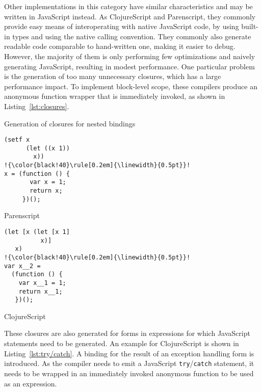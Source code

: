 \documentclass{acm_proc_article-sp}
\makeatletter
\newenvironment{sublisting}[2][]{%
\def\sf@one{#1}%
\def\sf@two{#2}%
\setbox\sf@box\hbox
\bgroup
}{%
\egroup
\ifx\@empty\sf@two\@empty\relax
\def\sf@two{\@empty}
\fi
\ifx\@empty\sf@one\@empty\relax
\subfloat[\sf@two]{\box\sf@box}%
\else
\subfloat[\sf@one][\sf@two]{\box\sf@box}%
\fi
}
\makeatother
\begin{document}
Other implementations in this category have similar characteristics
and may be written in JavaScript instead. As ClojureScript and
Parenscript, they commonly provide easy means of interoperating with
native JavaScript code, by using built-in types and using the native
calling convention. They commonly also generate readable code
comparable to hand-written one, making it easier to debug. However,
the majority of them is only performing few optimizations and naively
generating JavaScript, resulting in modest performance. One particular
problem is the generation of too many unnecessary closures, which has
a large performance impact. To implement block-level scope, these
compilers produce an anonymous function wrapper that is immediately
invoked, as shown in Listing~\ref{lst:closures}.

\begin{mylisting}[h]
  \caption{Generation of closures for nested bindings}
  \label{lst:closures}
  \vspace{-2em}
  \begin{sublisting}{Parenscript}
    \begin{minipage}[b]{.46\textwidth}
      \begin{lstlisting}[escapechar=!]
(setf x
      (let ((x 1))
        x))
!{\color{black!40}\rule[0.2em]{\linewidth}{0.5pt}}!
x = (function () {
       var x = 1;
       return x;
     })();
      \end{lstlisting}
    \end{minipage}
  \end{sublisting}
  \hfill
  \begin{sublisting}{ClojureScript}
    \begin{minipage}[b]{.46\textwidth}
      \begin{lstlisting}[escapechar=!]
(let [x (let [x 1]
          x)]
   x)
!{\color{black!40}\rule[0.2em]{\linewidth}{0.5pt}}!
var x__2 =
  (function () {
    var x__1 = 1;
    return x__1;
   })();
      \end{lstlisting}
    \end{minipage}
  \end{sublisting}
\end{mylisting}
\vspace{-0.5em}

These closures are also generated for forms in expressions for which
JavaScript statements need to be generated. An example for
ClojureScript is shown in Listing~\ref{lst:try/catch}. A binding for
the result of an exception handling form is introduced. As the
compiler needs to emit a JavaScript \texttt{try}/\texttt{catch}
statement, it needs to be wrapped in an immediately invoked anonymous
function to be used as an expression.
\end{document}
